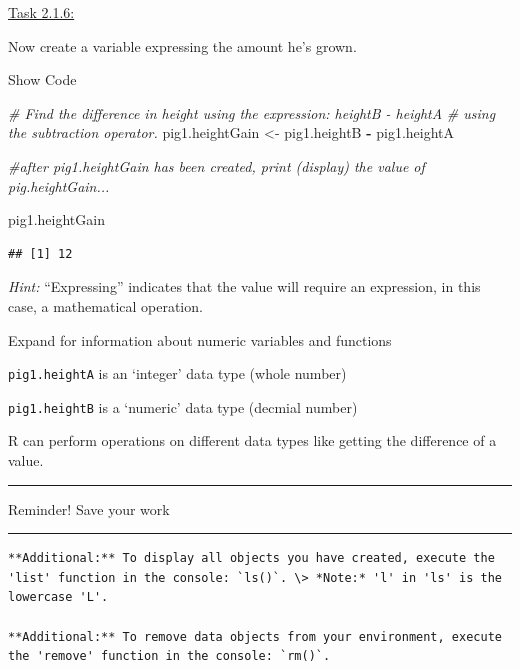 \documentclass[
]{article}
\newenvironment{Shaded}{\begin{snugshade}}{\end{snugshade}}
\newcommand{\CommentTok}[1]{\textcolor[rgb]{0.56,0.35,0.01}{\textit{#1}}}
\newcommand{\NormalTok}[1]{#1}
\newcommand{\OtherTok}[1]{\textcolor[rgb]{0.56,0.35,0.01}{#1}}
\newcommand{\SpecialCharTok}[1]{\textcolor[rgb]{0.81,0.36,0.00}{\textbf{#1}}}
\begin{document}
\ul{Task 2.1.6:}

Now create a variable expressing the amount he's grown.

Show Code

\begin{Shaded}
\begin{Highlighting}[]
\CommentTok{\# Find the difference in height using the expression: \textquotesingle{}heightB {-} heightA\textquotesingle{} }
\CommentTok{\# using the subtraction operator. }
\NormalTok{pig1.heightGain }\OtherTok{\textless{}{-}}\NormalTok{ pig1.heightB }\SpecialCharTok{{-}}\NormalTok{ pig1.heightA}

\CommentTok{\#after pig1.heightGain has been created, print (display) the value of pig.heightGain...}

\NormalTok{pig1.heightGain}
\end{Highlighting}
\end{Shaded}

\begin{verbatim}
## [1] 12
\end{verbatim}

\emph{Hint:} ``Expressing'' indicates that the value will require an
expression, in this case, a mathematical operation.

Expand for information about numeric variables and functions

\texttt{pig1.heightA} is an `integer' data type (whole number)

\texttt{pig1.heightB} is a `numeric' data type (decmial number)

R can perform operations on different data types like getting the
difference of a value.

\begin{center}\rule{0.5\linewidth}{0.5pt}\end{center}

Reminder! Save your work

\begin{center}\rule{0.5\linewidth}{0.5pt}\end{center}

\begin{verbatim}
**Additional:** To display all objects you have created, execute the 'list' function in the console: `ls()`. \> *Note:* 'l' in 'ls' is the lowercase 'L'.

**Additional:** To remove data objects from your environment, execute the 'remove' function in the console: `rm()`.
\end{verbatim}
\end{document}
